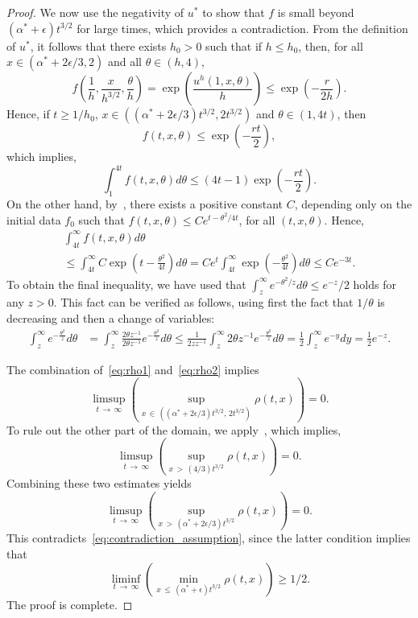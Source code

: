\documentclass[AHL,Unicode,longabstracts]{cedram}
\newcommand{\1}{\mathds{1}}
\newcommand{\e}{\epsilon}
\begin{document}
\begin{proof}
We now use the negativity of $u^*$ to show that $f$ is small beyond $(\alpha^* + \e) t^{3/2}$ for large times, which provides a contradiction. From the definition of $u^*$, it follows that there exists $h_0>0$ such that if $h \leq h_0$, then, for all $x \in (\alpha^*+2\e/3,2)$ and all $\theta \in (h,4)$,
\[
f\left (\frac 1h,\frac x{h^{3/2}}, \frac \theta h\right) = \exp\left (\frac{u^h(1,x,\theta)}h\right)\leq \exp\left(-\frac{r}{2h}\right).
\]
Hence, if $t \geq 1/h_0$, $x \in  ((\alpha^* + 2\e/3)t^{3/2}, 2t^{3/2})$ and $\theta \in (1, 4t)$, then
\[
f(t,x, \theta)
\leq \exp\left(-\frac{r t}2\right),
\]
which implies,
\begin{equation}\label{eq:rho1}
\int_1^{4t} f(t,x,\theta) d\theta
\leq (4t-1) \exp\left (-\frac{r t}2\right).
\end{equation}
On the other hand, by~\cite[Equation~(3.5)]{BHR_acceleration}, there exists a positive constant $C$, depending only on the initial data $f_0$ such that $f(t,x,\theta) \leq C e^{t - \theta^2/4t}$, for all $(t,x,\theta)$. Hence,
\begin{multline}\label{eq:rho2}
\int_{4t}^\infty f(t,x,\theta) d\theta\\
\leq \int_{4t}^\infty C \exp\left (t- \frac{\theta^2}{4t}\right)d\theta = C e^t \int_{4t}^\infty \exp\left (- \frac{\theta^2}{4t}\right)d\theta \leq C e^{-3t}.
\end{multline}
To obtain the final inequality, we have used that $\int_z^\infty e^{-\theta^2/z}d\theta \leq e^{-z}/2$ holds for any $z>0$. This fact can be verified as follows, using first the fact that $1/\theta$ is decreasing and then a change of variables:
\begin{align*}
\int_{z}^\infty e^{ - \frac{\theta^2}{z}}d\theta & =\int_{z}^\infty \frac{2\theta z^{-1}}{2\theta z^{-1}} e^{ - \frac{\theta^2}{z}}d\theta
\leq \frac{1}{2z z^{-1}} \int_{z}^\infty 2\theta z^{-1} e^{ - \frac{\theta^2}{z}}d\theta = \frac{1}{2} \int_{z}^\infty e^{-y}dy=\frac{1}{2}e^{-z}.
\end{align*}

The combination of~\eqref{eq:rho1} and~\eqref{eq:rho2} implies
\[
\limsup_{t\,\to\,\infty} \left (\sup_{x\,\in\,\left(\left(\alpha^* + 2\e/3\right)t^{3/2},\,2t^{3/2}\right)} \rho(t,x) \right) = 0.
\]
To rule out the other part of the domain, we apply~\cite[Theorem~1.2]{BHR_acceleration}, which implies,
\[
\limsup_{t\,\to\,\infty} \left (\sup_{x\,>\, (4/3)t^{3/2}} \rho(t,x)\right) = 0.
\]
Combining these two estimates yields
\[
\limsup_{t\,\to\,\infty} \left (\sup_{x\,>\, \left(\alpha^* + 2\e/3\right)t^{3/2}} \rho(t,x) \right) = 0.
\]
This contradicts~\eqref{eq:contradiction_assumption}, since the latter condition implies that
\[
\liminf_{t\,\to\,\infty}\left(\min_{x\,\leq\, \left(\alpha^* + \e\right)t^{3/2}} \rho(t,x) \right) \geq 1/2.
\]
The proof is complete.
\end{proof}
\end{document}
